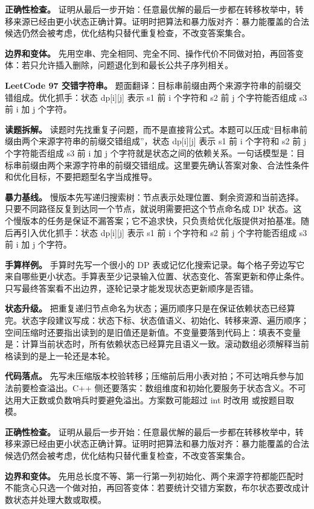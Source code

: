 \textbf{正确性检查。} 证明从最后一步开始：任意最优解的最后一步都在转移枚举中，转移来源已经由更小状态正确计算。证明时把算法和暴力版对齐：暴力能覆盖的合法候选仍然会被考虑，优化结构只替代重复检查，不改变答案集合。

\textbf{边界和变体。} 先用空串、完全相同、完全不同、操作代价不同做对拍，再回答变体：若只允许插入删除，问题退化到和最长公共子序列相关。

\noindent\textbf{LeetCode 97 交错字符串。} 题面翻译：目标串前缀由两个来源字符串的前缀交错组成。优化抓手：状态 dp[i][j] 表示 s1 前 i 个字符和 s2 前 j 个字符能否组成 s3 前 i 加 j 个字符。

\textbf{读题拆解。} 读题时先找重复子问题，而不是直接背公式。本题可以压成“目标串前缀由两个来源字符串的前缀交错组成”，状态 dp[i][j] 表示 s1 前 i 个字符和 s2 前 j 个字符能否组成 s3 前 i 加 j 个字符就是状态之间的依赖关系。一句话模型是：目标串前缀由两个来源字符串的前缀交错组成。这里要先确认答案对象、合法性条件和优化目标，不要把题型名字当成推导。

\textbf{暴力基线。} 慢版本先写递归搜索树：节点表示处理位置、剩余资源和当前选择。只要不同路径反复到达同一个节点，就说明需要把这个节点命名成 DP 状态。这个慢版本的任务是保证不漏答案；它不追求快，只负责给优化版提供对拍基准。随后再引入优化抓手：状态 dp[i][j] 表示 s1 前 i 个字符和 s2 前 j 个字符能否组成 s3 前 i 加 j 个字符。

\textbf{手算样例。} 手算时先写一个很小的 DP 表或记忆化搜索记录。每个格子旁边写它来自哪些更小状态。手算表至少记录输入位置、状态变化、答案更新和停止条件。只写最终答案看不出边界，逐轮记录才能发现状态更新顺序是否错。

\textbf{状态升级。} 把重复递归节点命名为状态；遍历顺序只是在保证依赖状态已经算完。状态字段建议写成：状态下标、状态值语义、初始化、转移来源、遍历顺序；空间压缩时还要指出读到的是旧值还是新值。不变量要落到代码上：填表不变量是：计算当前状态时，所有依赖状态已经算完且语义一致。滚动数组必须解释当前格读到的是上一轮还是本轮。

\textbf{代码落点。} 先写未压缩版本校验转移；压缩前后用小表对拍；不可达哨兵参与加法前要检查溢出。C++ 侧还要落实：数组维度和初始化要服务于状态含义。不可达用大正数或负数哨兵时要避免溢出。方案数可能超过 int 时改用  或按题目取模。

\textbf{正确性检查。} 证明从最后一步开始：任意最优解的最后一步都在转移枚举中，转移来源已经由更小状态正确计算。证明时把算法和暴力版对齐：暴力能覆盖的合法候选仍然会被考虑，优化结构只替代重复检查，不改变答案集合。

\textbf{边界和变体。} 先用总长度不等、第一行第一列初始化、两个来源字符都能匹配时不能贪心只选一个做对拍，再回答变体：若要统计交错方案数，布尔状态要改成计数状态并处理大数或取模。

